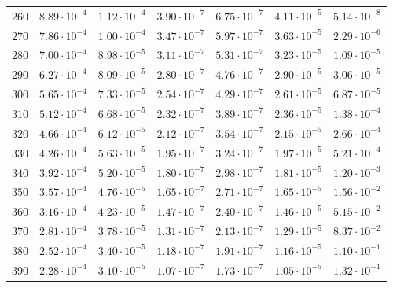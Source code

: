 \begin{table}
\begin{tabular}{lcccccc}
$260 $&$ 8.89\cdot 10^{-4}  $&$ 1.12\cdot 10^{-4}  $&$ 3.90\cdot 10^{-7}  $&$ 6.75\cdot 10^{-7}  $&$ 4.11\cdot 10^{-5}  $&$ 5.14\cdot 10^{-8}  $\\
$270 $&$ 7.86\cdot 10^{-4}  $&$ 1.00\cdot 10^{-4}  $&$ 3.47\cdot 10^{-7}  $&$ 5.97\cdot 10^{-7}  $&$ 3.63\cdot 10^{-5}  $&$ 2.29\cdot 10^{-6}  $\\
$280 $&$ 7.00\cdot 10^{-4}  $&$ 8.98\cdot 10^{-5}  $&$ 3.11\cdot 10^{-7}  $&$ 5.31\cdot 10^{-7}  $&$ 3.23\cdot 10^{-5}  $&$ 1.09\cdot 10^{-5}  $\\
$290 $&$ 6.27\cdot 10^{-4}  $&$ 8.09\cdot 10^{-5}  $&$ 2.80\cdot 10^{-7}  $&$ 4.76\cdot 10^{-7}  $&$ 2.90\cdot 10^{-5}  $&$ 3.06\cdot 10^{-5}  $\\
$300 $&$ 5.65\cdot 10^{-4}  $&$ 7.33\cdot 10^{-5}  $&$ 2.54\cdot 10^{-7}  $&$ 4.29\cdot 10^{-7}  $&$ 2.61\cdot 10^{-5}  $&$ 6.87\cdot 10^{-5}  $\\
$310 $&$ 5.12\cdot 10^{-4}  $&$ 6.68\cdot 10^{-5}  $&$ 2.32\cdot 10^{-7}  $&$ 3.89\cdot 10^{-7}  $&$ 2.36\cdot 10^{-5}  $&$ 1.38\cdot 10^{-4}  $\\
$320 $&$ 4.66\cdot 10^{-4}  $&$ 6.12\cdot 10^{-5}  $&$ 2.12\cdot 10^{-7}  $&$ 3.54\cdot 10^{-7}  $&$ 2.15\cdot 10^{-5}  $&$ 2.66\cdot 10^{-4}  $\\
$330 $&$ 4.26\cdot 10^{-4}  $&$ 5.63\cdot 10^{-5}  $&$ 1.95\cdot 10^{-7}  $&$ 3.24\cdot 10^{-7}  $&$ 1.97\cdot 10^{-5}  $&$ 5.21\cdot 10^{-4}  $\\
$340 $&$ 3.92\cdot 10^{-4}  $&$ 5.20\cdot 10^{-5}  $&$ 1.80\cdot 10^{-7}  $&$ 2.98\cdot 10^{-7}  $&$ 1.81\cdot 10^{-5}  $&$ 1.20\cdot 10^{-3}  $\\
$350 $&$ 3.57\cdot 10^{-4}  $&$ 4.76\cdot 10^{-5}  $&$ 1.65\cdot 10^{-7}  $&$ 2.71\cdot 10^{-7}  $&$ 1.65\cdot 10^{-5}  $&$ 1.56\cdot 10^{-2}  $\\
$360 $&$ 3.16\cdot 10^{-4}  $&$ 4.23\cdot 10^{-5}  $&$ 1.47\cdot 10^{-7}  $&$ 2.40\cdot 10^{-7}  $&$ 1.46\cdot 10^{-5}  $&$ 5.15\cdot 10^{-2}  $\\
$370 $&$ 2.81\cdot 10^{-4}  $&$ 3.78\cdot 10^{-5}  $&$ 1.31\cdot 10^{-7}  $&$ 2.13\cdot 10^{-7}  $&$ 1.29\cdot 10^{-5}  $&$ 8.37\cdot 10^{-2}  $\\
$380 $&$ 2.52\cdot 10^{-4}  $&$ 3.40\cdot 10^{-5}  $&$ 1.18\cdot 10^{-7}  $&$ 1.91\cdot 10^{-7}  $&$ 1.16\cdot 10^{-5}  $&$ 1.10\cdot 10^{-1}  $\\
$390 $&$ 2.28\cdot 10^{-4}  $&$ 3.10\cdot 10^{-5}  $&$ 1.07\cdot 10^{-7}  $&$ 1.73\cdot 10^{-7}  $&$ 1.05\cdot 10^{-5}  $&$ 1.32\cdot 10^{-1}  $\\

\end{tabular}
\end{table}
